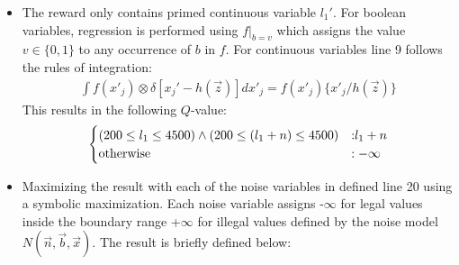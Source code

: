 \begin{itemize}
\item The reward only contains primed continuous variable $l_1'$. For boolean variables, regression is performed using $f|_{b=v}$ which assigns the value $v \in \{ 0,1 \}$ to any occurrence of $b$ in $f$. For continuous variables line 9 follows the rules of integration: 
{\footnotesize
\begin{align}
\int f(x'_j) \otimes \delta[x_j' - h(\vec{z})] dx'_j = f(x'_j) \{ x'_j / h(\vec{z}) \}\nonumber
\end{align}}
This results in the following $Q$-value: 
{\footnotesize
\begin{align*}
\begin{cases}
(200 \leq l_1 \leq 4500) \wedge (200 \leq (l_1 + n) \leq 4500) &: \hspace{-1mm} l_1 + n\\
\text{otherwise} &: -\infty\\
\end{cases}
\end{align*}
}
\item Maximizing the result with each of the noise variables in defined line 20 using a symbolic maximization. Each noise variable assigns -$\infty$ for legal values inside the boundary range +$\infty$ for illegal values defined by the noise model $N(\vec{n},\vec{b},\vec{x})$. The result is briefly defined below:

\end{itemize}
